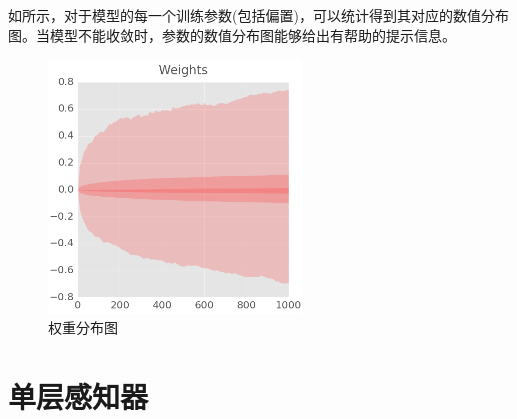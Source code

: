 \begin{content}
如所示，对于模型的每一个训练参数(包括偏置)，可以统计得到其对应的数值分布图。当模型不能收敛时，参数的数值分布图能够给出有帮助的提示信息。

\begin{figure}[H]
\centering
\includegraphics[width=0.6\textwidth]{figures/mnist-weight-fig.png}
\caption{权重分布图}
 \label{fig:mnist-weight-fig}
\end{figure}

\end{content}

\section{单层感知器}

